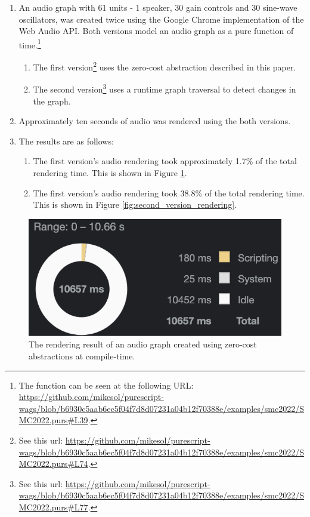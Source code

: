 \documentclass{article}
\begin{document}
\begin{enumerate}
  \item An audio graph with 61 units - 1 speaker, 30 gain controls and 30 sine-wave oscillators, was created twice using the Google Chrome implementation of the Web Audio API. Both versions model an audio graph as a pure function of time.\footnote{The function can be seen at the following URL: \url{https://github.com/mikesol/purescript-wags/blob/b6930c5aab6ec5f04f7d8d07231a04b12f70388e/examples/smc2022/SMC2022.purs\#L39}.}
  \begin{enumerate}[label*=\arabic*.]
    \item The first version\footnote{See this url: \url{https://github.com/mikesol/purescript-wags/blob/b6930c5aab6ec5f04f7d8d07231a04b12f70388e/examples/smc2022/SMC2022.purs\#L74}.} uses the zero-cost abstraction described in this paper.
    \item The second version\footnote{See this url: \url{https://github.com/mikesol/purescript-wags/blob/b6930c5aab6ec5f04f7d8d07231a04b12f70388e/examples/smc2022/SMC2022.purs\#L77}.} uses a runtime graph traversal to detect changes in the graph.
  \end{enumerate}
  \item Approximately ten seconds of audio was rendered using the both versions.
  \item The results are as follows:
  \begin{enumerate}[label*=\arabic*.]
    \item The first version's audio rendering took approximately 1.7\% of the total rendering time. This is shown in Figure \ref{fig:first_version_rendering}.
    \item The first version's audio rendering took 38.8\% of the total rendering time. This is shown in Figure \ref{fig:second_version_rendering}.
  \end{enumerate}
\end{enumerate}


\begin{figure}[t]
\centering
\includegraphics[width=0.6\columnwidth]{fast}
\caption{The rendering result of an audio graph created using zero-cost abstractions at compile-time.\label{fig:first_version_rendering}}
\end{figure}
\end{document}
